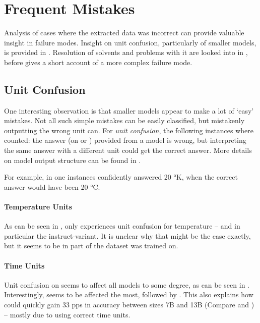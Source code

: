 \section{Frequent Mistakes}\label{sec:mistakes}
Analysis of cases where the extracted data was incorrect can provide valuable insight in failure modes.
Insight on unit confusion, particularly of smaller models, is provided in .
Resolution of solvents and problems with it are looked into in , before  gives a short account of a more complex failure mode.

\subsection{Unit Confusion}\label{sub:unitconfusion}




One interesting observation is that smaller models appear to make a lot of `easy' mistakes.
Not all such simple mistakes can be easily classified, but mistakenly outputting the wrong unit can.
For \textit{unit confusion}, the following instances where counted: the answer (on \ttemp or \ttime) provided from a model is wrong, but interpreting the same answer with a different unit could get the correct answer.
More details on model output structure can be found in .

For example, in one instances  confidently answered 20 °K, when the correct answer would have been 20 °C.

\paragraph{Temperature Units}
As can be seen in , only  experiences unit confusion for temperature -- and in particular the instruct-variant.
It is unclear why that might be the case exactly, but it seems to be in part of the dataset  was trained on.

\paragraph{Time Units}
Unit confusion on \ttime seems to affect all models to some degree, as can be seen in .
Interestingly,  seems to be affected the most, followed by .
This also explains how  could quickly gain 33 \glspl{pp} in accuracy between sizes 7B and 13B (Compare  and ) -- mostly due to using correct time units.


